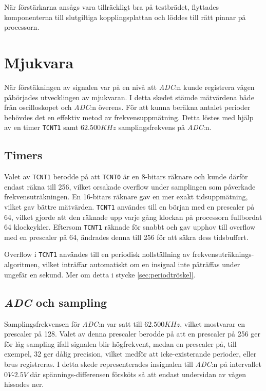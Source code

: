 \documentclass[a4paper]{article}
\begin{document}
När förstärkarna ansågs vara tillräckligt bra på testbrädet, flyttades komponenterna till slutgiltiga kopplingsplattan och löddes till rätt pinnar på processorn.

\section{Mjukvara}
När förstäkningen av signalen var på en nivå att \textit{ADC}:n kunde registrera vågen påbörjades utvecklingen av mjukvaran. I detta skedet stämde mätvärdena både från oscilloskopet och \textit{ADC}:n överens. För att kunna beräkna antalet perioder behövdes det en effektiv metod av frekvensuppmätning. Detta löstes med hjälp av en timer \texttt{TCNT1} samt $62.500KHz$ samplingsfrekvens på \textit{ADC}:n.

\subsection{Timers}
Valet av \texttt{TCNT1} berodde på att \texttt{TCNT0} är en 8-bitars räknare och kunde därför endast räkna till 256, vilket orsakade overflow under samplingen som påverkade frekvensuträkningen. En 16-bitars räknare gav en mer exakt tidsuppmätning, vilket gav bättre mätvärden. \texttt{TCNT1} användes till en början med en prescaler på 64, vilket gjorde att den räknade upp varje gång klockan på processorn fullbordat 64 klockcykler. Eftersom \texttt{TCNT1} räknade för snabbt och gav upphov till overflow med en prescaler på 64, ändrades denna till 256 för att säkra dess tidsbuffert.

Overflow i \texttt{TCNT1} användes till en periodisk nollställning av frekvensuträknings-algoritmen, vilket inträffar automatiskt om en insignal inte påträffas under ungefär en sekund. Mer om detta i stycke \ref{sec:periodtröskel}.

\subsection{\textit{ADC} och sampling}
Samplingsfrekvensen för \textit{ADC}:n var satt till $62.500KHz$, vilket mostvarar en prescaler på 128. Valet av denna prescaler berodde på att en prescaler på 256 ger för låg sampling ifall signalen blir högfrekvent, medan en prescaler på, till exempel, 32 ger dålig precision, vilket medför att icke-existerande perioder, eller brus registreras. I detta skede representerades insignalen till \textit{ADC}:n på intervallet $0V$-$2.5V$ där spännings-differensen försköts så att endast undersidan av vågen hissades ner. 
\end{document}
